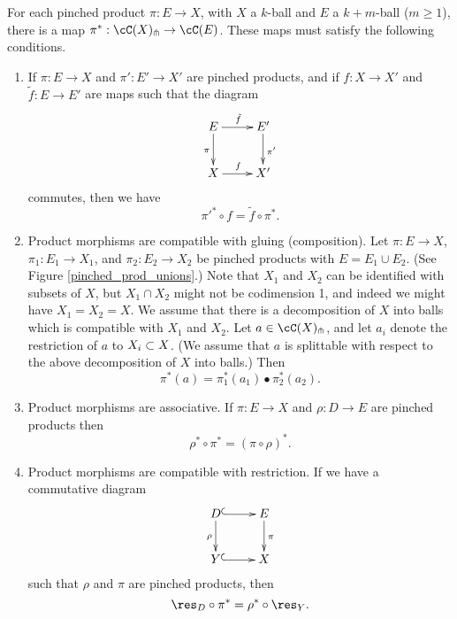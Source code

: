 \begin{axiom}
\label{axiom:product}
For each pinched product $\pi:E\to X$, with $X$ a $k$-ball and $E$ a $k{+}m$-ball ($m\ge 1$),
there is a map $\pi^*:\cC(X)\trans{}\to \cC(E)$.
These maps must satisfy the following conditions.
\begin{enumerate}
\item
If $\pi:E\to X$ and $\pi':E'\to X'$ are pinched products, and
if $f:X\to X'$ and $\tilde{f}:E \to E'$ are maps such that the diagram
\[ \xymatrix{
	E \ar[r]^{\tilde{f}} \ar[d]_{\pi} & E' \ar[d]^{\pi'} \\
	X \ar[r]^{f} & X'
} \]
commutes, then we have 
\[
	\pi'^*\circ f = \tilde{f}\circ \pi^*.
\]
\item
Product morphisms are compatible with gluing (composition).
Let $\pi:E\to X$, $\pi_1:E_1\to X_1$, and $\pi_2:E_2\to X_2$ 
be pinched products with $E = E_1\cup E_2$.
(See Figure \ref{pinched_prod_unions}.)  
Note that $X_1$ and $X_2$ can be identified with subsets of $X$, 
but $X_1 \cap X_2$ might not be codimension 1, and indeed we might have $X_1 = X_2 = X$.
We assume that there is a decomposition of $X$ into balls which is compatible with
$X_1$ and $X_2$.
Let $a\in \cC(X)\trans{}$, and let $a_i$ denote the restriction of $a$ to $X_i\subset X$.
(We assume that $a$ is splittable with respect to the above decomposition of $X$ into balls.)
Then 
\[
	\pi^*(a) = \pi_1^*(a_1)\bullet \pi_2^*(a_2) .
\]
\item
Product morphisms are associative.
If $\pi:E\to X$ and $\rho:D\to E$ are pinched products then
\[
	\rho^*\circ\pi^* = (\pi\circ\rho)^* .
\]
\item
Product morphisms are compatible with restriction.
If we have a commutative diagram
\[ \xymatrix{
	D \ar@{^(->}[r] \ar[d]_{\rho} & E \ar[d]^{\pi} \\
	Y \ar@{^(->}[r] & X
} \]
such that $\rho$ and $\pi$ are pinched products, then
\[
	\res_D\circ\pi^* = \rho^*\circ\res_Y .
\]
\end{enumerate}
\end{axiom}


\medskip







